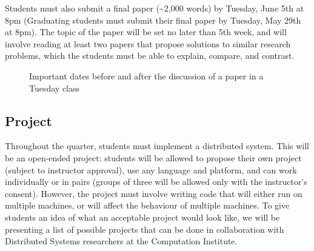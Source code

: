 \documentclass[11pt]{article}
\begin{document}
Students must also submit a final paper (\~{}2,000 words) by Tuesday, June 5th at 8pm (Graduating students must submit their final paper by Tuesday, May 29th at 8pm). The topic of the paper will be set no later than 5th week, and will involve reading at least two papers that propose solutions to similar research problems, which the students must be able to explain, compare, and contrast.


\begin{figure}
\begin{center}
\caption{Important dates before and after the discussion of a paper in a Tuesday class}
\label{fig:discussdates}
\end{center}
\end{figure}


\subsection{Project}

Throughout the quarter, students must implement a distributed system. This will be an open-ended project: students will be allowed to propose their own project (subject to instructor approval), use any language and platform, and can work individually or in pairs (groups of three will be allowed only with the instructor's consent). However, the project must involve writing code that will either run on multiple machines, or will affect the behaviour of multiple machines. To give students an idea of what an acceptable project would look like, we will be presenting a list of possible projects that can be done in collaboration with Distributed Systems researchers at the Computation Institute.
\end{document}
